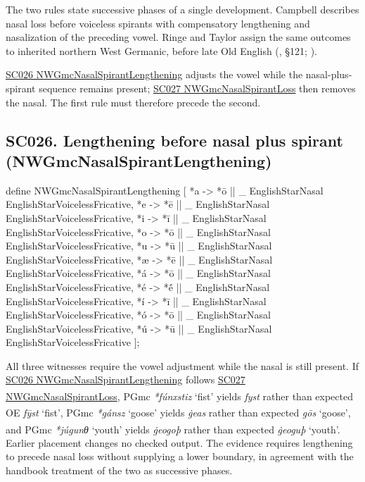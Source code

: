 \documentclass[
  british,
  a4paper,
  openany]{book}
\providecommand{\Pred}[1]{\textsuperscript{\dag}\emph{#1}}
\providecommand{\Recon}[1]{\emph{*#1}}
{\catcode`→=\active \global\def→{\ensuremath{\rightarrow}}}
\providecommand{\texorpdfstring}[2]{#1}
\DeclareRobustCommand{\CAPRRuleHeading}[2]{%
  #1\texorpdfstring{\\(#2)}{ (#2)}%
}
\providecommand{\Pred}[1]{\textsuperscript{\dag}\emph{#1}}
\providecommand{\Recon}[1]{\emph{*#1}}
{\catcode`→=\active \global\def→{\ensuremath{\rightarrow}}}
\begin{document}
The two rules state successive phases of a single development. Campbell
describes nasal loss before voiceless spirants with compensatory
lengthening and nasalization of the preceding vowel. Ringe and Taylor
assign the same outcomes to inherited northern West Germanic, before
late Old English (, §121;
).

\hyperref[rule-NWGmcNasalSpirantLengthening]{SC026
NWGmcNasalSpirantLengthening} adjusts the vowel while the
nasal-plus-spirant sequence remains present;
\hyperref[rule-NWGmcNasalSpirantLoss]{SC027 NWGmcNasalSpirantLoss} then
removes the nasal. The first rule must therefore precede the second.

\subsection{\texorpdfstring{\CAPRRuleHeading{SC026. Lengthening before nasal plus spirant}{NWGmcNasalSpirantLengthening}}{}}\label{rule-NWGmcNasalSpirantLengthening}

\begin{ReaderFacingFoma}
define NWGmcNasalSpirantLengthening [
    {*a} -> {*ō} || _ EnglishStarNasal EnglishStarVoicelessFricative,
    {*e} -> {*ē} || _ EnglishStarNasal EnglishStarVoicelessFricative,
    {*i} -> {*ī} || _ EnglishStarNasal EnglishStarVoicelessFricative,
    {*o} -> {*ō} || _ EnglishStarNasal EnglishStarVoicelessFricative,
    {*u} -> {*ū} || _ EnglishStarNasal EnglishStarVoicelessFricative,
    {*æ} -> {*ē} || _ EnglishStarNasal EnglishStarVoicelessFricative,
    {*á} -> {*ō} || _ EnglishStarNasal EnglishStarVoicelessFricative,
    {*é} -> {*ḗ} || _ EnglishStarNasal EnglishStarVoicelessFricative,
    {*í} -> {*ī} || _ EnglishStarNasal EnglishStarVoicelessFricative,
    {*ó} -> {*ō} || _ EnglishStarNasal EnglishStarVoicelessFricative,
    {*ú} -> {*ū} || _ EnglishStarNasal EnglishStarVoicelessFricative
];
\end{ReaderFacingFoma}

All three witnesses require the vowel adjustment while the nasal is
still present. If \hyperref[rule-NWGmcNasalSpirantLengthening]{SC026
NWGmcNasalSpirantLengthening} follows
\hyperref[rule-NWGmcNasalSpirantLoss]{SC027 NWGmcNasalSpirantLoss}, PGmc
\Recon{fúnxstiz} `fist' yields \Pred{fyst} rather than expected OE
\emph{fȳst} `fist', PGmc \Recon{gánsz} `goose' yields \Pred{ġeas} rather
than expected \emph{gōs} `goose', and PGmc \Recon{júgunθ} `youth' yields
\Pred{ġeogoþ} rather than expected \emph{ġeoguþ} `youth'. Earlier
placement changes no checked output. The evidence requires lengthening
to precede nasal loss without supplying a lower boundary, in agreement
with the handbook treatment of the two as successive phases.
\end{document}
